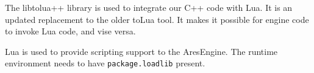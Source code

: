 

\startitemize[4]

The libtolua++ library is used to integrate our C++ code with Lua. It is an updated replacement to the older toLua tool. It makes it possible for engine code to invoke Lua code, and vise versa.


Lua is used to provide scripting support to the AresEngine. The runtime environment needs to have {\tt package.loadlib} present.
\stopitemize

